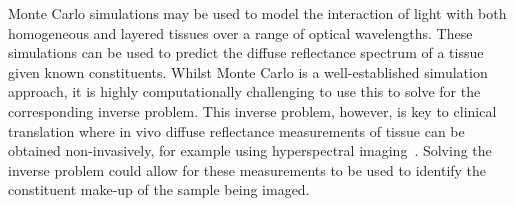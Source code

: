 

Monte Carlo simulations may be used to model
the interaction of light with
both homogeneous and layered tissues
over a range of optical wavelengths.
These simulations can be used to predict the diffuse reflectance spectrum of a tissue given known constituents. Whilst Monte Carlo is a well-established simulation approach, it is highly computationally challenging to use this to solve for the corresponding inverse problem. This inverse problem, however, is key to clinical translation where in vivo diffuse reflectance measurements of tissue can be obtained non-invasively, for example using hyperspectral imaging~\citep{Clancy2020}. Solving the inverse problem could allow for these measurements to be used to identify the constituent make-up of the sample being imaged. 

